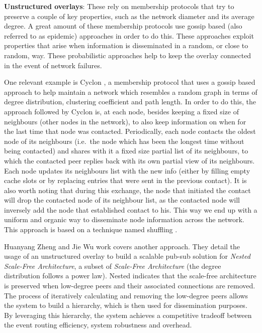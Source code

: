 \textbf{Unstructured overlays}: These rely on membership protocols that
try to preserve a couple of key properties, such as the network diameter
and its average degree. A great amount of these membership protocols use
gossip based (also referred to as epidemic) approaches in order to do
this. These approaches exploit properties that arise when information is
disseminated in a random, or close to random, way. These probabilistic
approaches help to keep the overlay connected in the event of network
failures.

One relevant example is Cyclon \cite{Voulgaris2005a}, a membership
protocol that uses a gossip based approach to help maintain a network
which resembles a random graph in
terms of degree distribution, clustering coefficient and path length. In
order to do this, the approach followed by Cyclon is, at each node,
besides keeping a fixed size of neighbours (other nodes in the network),
to also keep information on when for the last time that node was
contacted. Periodically, each node contacts the oldest node of its
neighbours (i.e.~the node which has been the longest time without being
contacted) and shares with it a fixed size partial list of its
neighbours, to which the contacted peer replies back with its own
partial view of its neighbours. Each node updates its neighbours list
with the new info (either by filling empty cache slots or by replacing
entries that were sent in the previous contact). It is also worth noting
that during this exchange, the node that initiated the contact will drop
the contacted node of its neighbour list, as the contacted node will
inversely add the node that established contact to his. This way we end
up with a uniform and organic way to disseminate node information across
the network. This approach is based on a technique named shuffling \cite{Stavrou2002}.

Huanyang Zheng and Jie Wu \cite{Zheng2016} work covers another approach. They
detail the usage of an unstructured overlay to build a scalable pub-sub
solution for \emph{Nested Scale-Free Architecture}, a subset of
\emph{Scale-Free Architecture} (the degree distribution follows a power law).
Nested indicates that the scale-free architecture is preserved when low-degree
peers and their associated connections are removed. The process of iteratively
calculating and removing the low-degree peers allows the system to build a
hierarchy, which is then used for dissemination purposes. By leveraging this
hierarchy, the system achieves a competitive tradeoff between the event routing
efficiency, system robustness and overhead.

